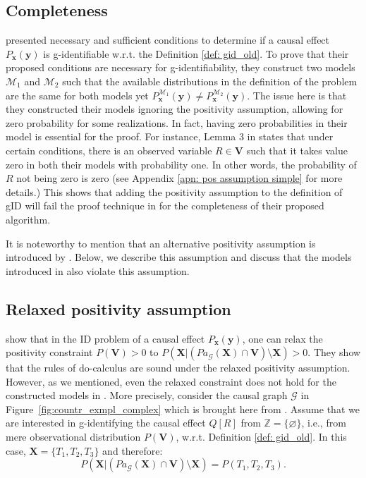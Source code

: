 \documentclass[accepted]{uai2022}
\newcommand{\Pa}[2]{\textit{Pa}_{#2}(#1)}
\newcommand{\V}[0]{\mathbf{V}}
\newcommand{\X}[0]{\mathbf{X}}
\newcommand{\G}[0]{\mathcal{G}}
\newcommand{\M}[0]{\mathcal{M}}
\begin{document}
    \subsection{Completeness}
        \citep{lee2019general} presented necessary and sufficient conditions to determine if a causal effect $P_{\textbf{x}}(\textbf{y})$ is g-identifiable w.r.t. the Definition \ref{def: gid_old}.
        To prove that their proposed conditions are necessary for g-identifiability, they construct two models $\M_1$ and $\M_2$ such that the available distributions in the definition of the problem are the same for both models yet $P^{\M_1}_{\textbf{x}}(\textbf{y})\neq P^{\M_2}_{\textbf{x}}(\textbf{y})$.
        The issue here is that they constructed their models ignoring the positivity assumption, allowing for zero probability for some realizations. 
        In fact, having zero probabilities in their model is essential for the proof. 
        For instance, Lemma 3 in \cite{lee2019general} states that under certain conditions, there is an observed variable $R\in \V$ such that it takes value zero in both their models with probability one.
        In other words, the probability of $R$ not being zero is zero (see Appendix \ref{apn: pos assumption simple} for more details.)
        This shows that adding the positivity assumption to the definition of gID will fail the proof technique in \citep{lee2019general} for the completeness of their proposed algorithm.
        
        It is noteworthy to mention that an alternative positivity assumption is introduced by \cite{shpitser2006identification}. 
        Below, we describe this assumption and discuss that the models introduced in \cite{lee2019general} also violate this assumption.
    
    \subsection{Relaxed positivity assumption}
        \cite{shpitser2006identification} show that in the ID problem of a causal effect \mbox{$P_{\mathbf{x}}(\mathbf{y})$}, one can relax the positivity constraint \mbox{$P(\mathbf{V})>0$} to \mbox{$P(\mathbf{X}|\left(\Pa{\mathbf{X}}{\G}\cap\mathbf{V}\right) \setminus \mathbf{X})>0$}.
        They show that the rules of do-calculus are sound under the relaxed positivity assumption.
        However, as we mentioned, even the relaxed constraint does not hold for the constructed models in \mbox{\cite{lee2019general}}.
        More precisely, consider the causal graph $\G$ in \mbox{Figure \ref{fig:countr_exmpl_complex}} which is brought here from \cite{lee2019general}. 
        Assume that we are interested in g-identifying the causal effect $Q[R]$ from $\mathbb{Z}=\{\varnothing\}$, i.e., from mere observational distribution $P(\V)$, w.r.t. Definition \ref{def: gid_old}.
        In this case, $\X=\{T_1, T_2, T_3\}$ and therefore:
        \begin{equation*}
            P(\mathbf{X}|\left(\Pa{\mathbf{X}}{\G}\cap\mathbf{V}\right) \setminus \mathbf{X}) = P(T_1, T_2, T_3).  
        \end{equation*}
        
\end{document}
